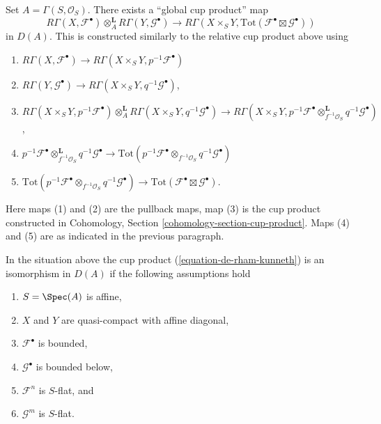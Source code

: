 \medskip\noindent
Set $A = \Gamma(S, \mathcal{O}_S)$. There exists a ``global cup product'' map
\begin{equation}
\label{equation-de-rham-kunneth}
R\Gamma(X, \mathcal{F}^\bullet)
\otimes_A^\mathbf{L}
R\Gamma(Y, \mathcal{G}^\bullet)
\longrightarrow
R\Gamma(X \times_S Y,
\text{Tot}(\mathcal{F}^\bullet \boxtimes \mathcal{G}^\bullet))
\end{equation}
in $D(A)$. This is constructed similarly to the relative cup product above
using
\begin{enumerate}
\item $R\Gamma(X, \mathcal{F}^\bullet) \to
R\Gamma(X \times_S Y, p^{-1}\mathcal{F}^\bullet)$
\item $R\Gamma(Y, \mathcal{G}^\bullet) \to
R\Gamma(X \times_S Y, q^{-1}\mathcal{G}^\bullet)$,
\item $R\Gamma(X \times_S Y, p^{-1}\mathcal{F}^\bullet)
\otimes_A^\mathbf{L} R\Gamma(X \times_S Y, q^{-1}\mathcal{G}^\bullet) \to
R\Gamma(X \times_S Y,
p^{-1}\mathcal{F}^\bullet \otimes_{f^{-1}\mathcal{O}_S}^\mathbf{L}
q^{-1}\mathcal{G}^\bullet)$,
\item
$p^{-1}\mathcal{F}^\bullet \otimes_{f^{-1}\mathcal{O}_S}^\mathbf{L}
q^{-1}\mathcal{G}^\bullet \to
\text{Tot}(p^{-1}\mathcal{F}^\bullet \otimes_{f^{-1}\mathcal{O}_S}
q^{-1}\mathcal{G}^\bullet)$
\item
$\text{Tot}(p^{-1}\mathcal{F}^\bullet \otimes_{f^{-1}\mathcal{O}_S}
q^{-1}\mathcal{G}^\bullet) \to \text{Tot}(\mathcal{F}^\bullet \boxtimes
\mathcal{G}^\bullet)$.
\end{enumerate}
Here maps (1) and (2) are the pullback maps, map (3) is the cup product
constructed in Cohomology, Section \ref{cohomology-section-cup-product}.
Maps (4) and (5) are as indicated in the previous paragraph.

\begin{lemma}
\label{lemma-kunneth-special}
In the situation above the cup product (\ref{equation-de-rham-kunneth})
is an isomorphism in $D(A)$ if the following assumptions hold
\begin{enumerate}
\item $S = \Spec(A)$ is affine,
\item $X$ and $Y$ are quasi-compact with affine diagonal,
\item $\mathcal{F}^\bullet$ is bounded,
\item $\mathcal{G}^\bullet$ is bounded below,
\item $\mathcal{F}^n$ is $S$-flat, and
\item $\mathcal{G}^m$ is $S$-flat.
\end{enumerate}
\end{lemma}

